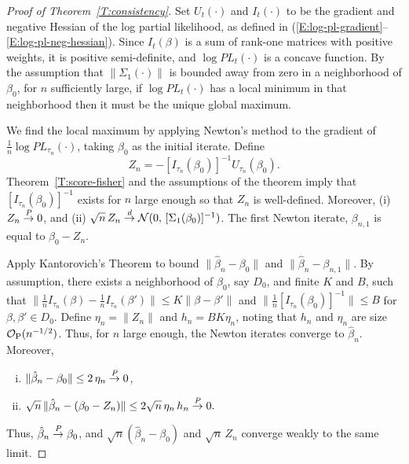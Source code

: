 \documentclass[aoas,preprint]{imsart}
\begin{document}
\begin{proof}[Proof of Theorem~\ref{T:consistency}]

Set $U_t(\cdot)$ and $I_t(\cdot)$ to be the gradient and negative
Hessian of the log partial likelihood, as defined in
(\ref{E:log-pl-gradient}--\ref{E:log-pl-neg-hessian}).  Since
$I_t(\beta)$ is a sum of rank-one matrices with positive weights,
it is positive semi-definite, and $\log \mathit{PL}_t(\cdot)$ is
a concave function.  By the assumption that $\| \Sigma_1(\cdot) \|$
is bounded away from zero in a neighborhood of $\beta_0$, for $n$
sufficiently large, if $\log \mathit{PL}_t(\cdot)$ has a local minimum
in that neighborhood then it must be the unique global maximum.

We find the local maximum by applying Newton's method to the
gradient of $\tfrac{1}{n} \log \mathit{PL}_{\tau_n}(\cdot)$, taking
$\beta_0$ as the initial iterate.  Define
\[
    Z_n = -[I_{\tau_n}(\beta_0)]^{-1} U_{\tau_n}(\beta_0).
\]
Theorem~\ref{T:score-fisher} and the
assumptions of the theorem imply that $[I_{\tau_n}(\beta_0)]^{-1}$
exists for $n$ large enough so that $Z_n$ is well-defined.  Moreover,
(i) $Z_n \overset{\mathit{P}}{\to} 0$, and
(ii) $\sqrt{n} \, Z_n \overset{\mathit{d}}{\to} \mathcal{N}(0, \, [\Sigma_1(\beta_0)]^{-1})$.
The first Newton iterate, $\beta_{n,1}$ is equal to $\beta_0 - Z_n$.

Apply Kantorovich's Theorem to bound $\| \hat \beta_n - \beta_0 \|$
and $\| \hat \beta_n - \beta_{n,1} \|$.  By assumption, there exists
a neighborhood of $\beta_0$, say $D_0$, and finite $K$ and $B$, such that 
\(
    \|
        \frac{1}{n} I_{\tau_n} (\beta)
        -
        \frac{1}{n} I_{\tau_n}(\beta')
    \|
    \leq
    K
    \|
        \beta
        -
        \beta'
    \|
\)
and
\(
    \| \frac{1}{n} [I_{\tau_n}(\beta_0)]^{-1} \| \leq B
\)
for $\beta, \beta' \in D_0$.
Define $\eta_n = \| Z_n \|$ and $h_n = B K \eta_n$, noting that $h_n$ and
$\eta_n$ are size $\mathcal{O}_\text{P}(n^{-1/2})$.  Thus, for $n$ large enough, the
Newton iterates converge to $\hat \beta_n$.  Moreover,
\begin{enumerate}[(i)]
    \item $\| \hat \beta_n - \beta_0 \| \leq 2 \, \eta_n \overset{\mathit{P}}{\to} 0$,
    \item 
        \(
            \sqrt{n} \, \| \hat \beta_n - (\beta_0 - Z_n) \|
            \leq
            2 \sqrt{n} \, \eta_n \, h_n
            \overset{\mathit{P}}{\to} 0.
        \)
\end{enumerate}
Thus, $\hat \beta_n \overset{\mathit{P}}{\to} \beta_0$, and $\sqrt{n} (\hat \beta_n - \beta_0)$
and $\sqrt{n} \, Z_n$ converge weakly to the same limit.

\end{proof}
\end{document}
